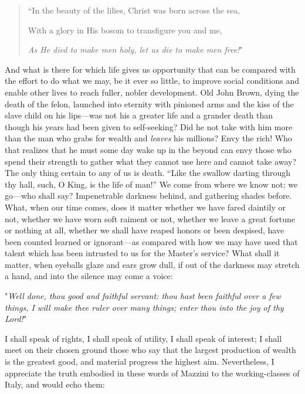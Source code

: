 \documentclass{book}
\begin{document}
\begin{quotation}
	“In the beauty of the lilies, Christ was born across the sea,

	With a glory in His bosom to transfigure you and me,

	\emph{As He died to make men holy, let us die to make men free!}"\footnotemark[1]
\end{quotation}

And what is there for which life gives us opportunity that can be compared with the effort to do what we may, be it ever so little, to improve social conditions and enable other lives to reach fuller, nobler development. Old John Brown, dying the death of the felon, launched into eternity with pinioned arms and the kiss of the slave child on his lips—was not his a greater life and a grander death than though his years had been given to self-seeking? Did he not take with him more than the man who grabs for wealth and \emph{leaves} his millions? Envy the rich! Who that realizes that he must some day wake up in the beyond can envy those who spend their strength to gather what they cannot use here and cannot take away? The only thing certain to any of us is death. “Like the swallow darting through thy hall, such, O King, is the life of man!” We come from where we know not; we go—who shall say? Impenetrable darkness behind, and gathering shades before. What, when our time comes, does it matter whether we have fared daintily or not, whether we have worn soft raiment or not, whether we leave a great fortune or nothing at all, whether we shall have reaped honors or been despised, have been counted learned or ignorant—as compared with how we may have used that talent which has been intrusted to us for the Master’s service? What shall it matter, when eyeballs glaze and ears grow dull, if out of the darkness may stretch a hand, and into the silence may come a voice:

"\emph{Well done, thou good and faithful servant: thou hast been faithful over a few things, I will make thee ruler over many things; enter thou into the joy of thy Lord!}"

I shall speak of rights, I shall speak of utility, I shall speak of interest; I shall meet on their chosen ground those who say that the largest production of wealth is the greatest good, and material progress the highest aim. Nevertheless, I appreciate the truth embodied in these words of Mazzini to the working-classes of Italy, and would echo them:
\end{document}
